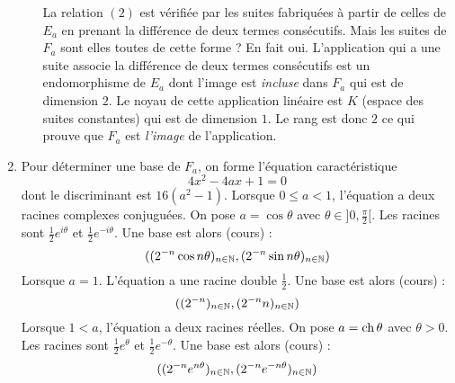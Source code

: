 \begin{enumerate}
\begin{enumerate}
La relation $(2)$ est vérifiée par les suites fabriquées à partir de celles de $E_a$ en prenant la différence de deux termes consécutifs. Mais les suites de $F_a$ sont elles toutes de cette forme ? \newline
En fait oui. L'application qui a une suite associe la différence de deux termes consécutifs est un endomorphisme de $E_a$ dont l'image est \emph{incluse} dans $F_a$ qui est de dimension $2$. Le noyau de cette application linéaire est $K$ (espace des suites constantes) qui est de dimension $1$. Le rang est donc $2$ ce qui prouve que $F_a$ est \emph{l'image} de l'application.
\end{enumerate}
\item Pour déterminer une base de $F_a$, on forme l'équation caractéristique
\begin{displaymath}
4x^2-4ax+1=0 
\end{displaymath}
dont le discriminant est $16(a^2-1)$.\newline
Lorsque $0\leq a <1$, l'équation a deux racines complexes conjuguées. On pose $a=\cos \theta$ avec $\theta \in ]0,\frac{\pi}{2}[$. Les racines sont $\frac{1}{2}e^{i\theta}$ et $\frac{1}{2}e^{-i\theta}$. Une base est alors (cours) :
\begin{displaymath}
 ((2^{-n}\cos n\theta)_{n\in\mathbb{N}},(2^{-n}\sin n\theta)_{n\in\mathbb{N}})
\end{displaymath}
Lorsque $a=1$. L'équation a une racine double $\frac{1}{2}$.  Une base est alors (cours) :
\begin{displaymath}
 ((2^{-n})_{n\in\mathbb{N}},(2^{-n} n)_{n\in\mathbb{N}})
\end{displaymath}
Lorsque $1<a$, l'équation a deux racines réelles. On pose $a=\operatorname{ch} \theta$ avec $\theta >0$. Les racines sont $\frac{1}{2}e^{\theta}$ et $\frac{1}{2}e^{-\theta}$. Une base est alors (cours) :
\begin{displaymath}
 ((2^{-n}e^{n\theta})_{n\in\mathbb{N}},(2^{-n}e^{-n\theta})_{n\in\mathbb{N}})
\end{displaymath}


\end{enumerate}

